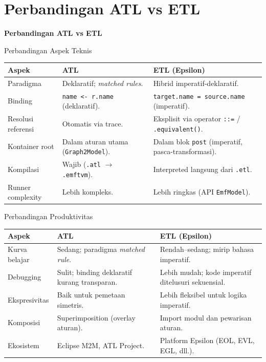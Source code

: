 \documentclass[aspectratio=169, table]{beamer}
\begin{document}
\section{Perbandingan ATL vs ETL}
\begin{frame}{\hfill}
	\centering
	\Huge{\textbf{Perbandingan ATL vs ETL}}
\end{frame}

\begin{frame}{Perbandingan Aspek Teknis}
\vspace{4pt}
\centering
\scriptsize
\begin{tabular}{|>{\raggedright\arraybackslash}p{}|>{\raggedright\arraybackslash}p{}|>{\raggedright\arraybackslash}p{}|}
\hline
\rowcolor{blue!12}
\textbf{Aspek} & \textbf{ATL} & \textbf{ETL (Epsilon)} \\
\hline
Paradigma & Deklaratif; \textit{matched rules}. & Hibrid imperatif-deklaratif. \\
\hline
Binding & \texttt{name <- r.name} (deklaratif). & \texttt{target.name = source.name} (imperatif). \\
\hline
Resolusi referensi & Otomatis via trace. & Eksplisit via operator \texttt{::=} / \texttt{.equivalent()}. \\
\hline
Kontainer root & Dalam aturan utama (\texttt{Graph2Model}). & Dalam blok \texttt{post} (imperatif, pasca-transformasi). \\
\hline
Kompilasi & Wajib (\texttt{.atl} $\rightarrow$ \texttt{.emftvm}). & Interpreted langsung dari \texttt{.etl}. \\
\hline
Runner complexity & Lebih kompleks. & Lebih ringkas (API \texttt{EmfModel}). \\
\hline
\end{tabular}
\end{frame}

\begin{frame}{Perbandingan Produktivitas}
\vspace{4pt}
\centering
\scriptsize
\begin{tabular}{|>{\raggedright\arraybackslash}p{}|>{\raggedright\arraybackslash}p{}|>{\raggedright\arraybackslash}p{}|}
\hline
\rowcolor{blue!12}
\textbf{Aspek} & \textbf{ATL} & \textbf{ETL (Epsilon)} \\
\hline
Kurva belajar & Sedang; paradigma \textit{matched rule}. & Rendah--sedang; mirip bahasa imperatif. \\
\hline
Debugging & Sulit; binding deklaratif kurang transparan. & Lebih mudah; kode imperatif ditelusuri sekuensial. \\
\hline
Ekspresivitas & Baik untuk pemetaan simetris. & Lebih fleksibel untuk logika imperatif. \\
\hline
Komposisi & Superimposition (overlay aturan). & Import modul dan pewarisan aturan. \\
\hline
Ekosistem & Eclipse M2M, ATL Project. & Platform Epsilon (EOL, EVL, EGL, dll.). \\
\hline
\end{tabular}
\end{frame}
\end{document}
